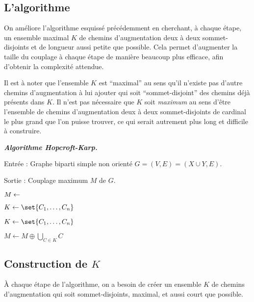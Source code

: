  \subsection{L'algorithme}
 
 On améliore l'algorithme esquissé précédemment en cherchant, à chaque étape, un ensemble maximal $K$ de chemins d'augmentation deux à deux sommet-disjoints et de longueur aussi petite que possible. Cela permet d'augmenter la taille du couplage à chaque étape de manière beaucoup plus efficace, afin d'obtenir la complexité attendue.
 
 Il est à noter que l'ensemble $K$ est ``maximal'' au sens qu'il n'existe pas d'autre chemins d'augmentation à lui ajouter qui soit ``sommet-disjoint'' des chemins déjà présents dans $K$. Il n'est pas nécessaire que $K$ soit \emph{maximum} au sens d'être l'ensemble de chemins d'augmentation deux à deux sommet-disjoints de cardinal le plus grand que l'on puisse trouver, ce qui serait autrement plus long et difficile à construire.
 
 \SEP \emph{\bfseries Algorithme Hopcroft-Karp.}
    
    Entrée : Graphe biparti simple non orienté $G = (V,E) = (X \cup Y, E)$.
    
    Sortie : Couplage maximum $M$ de $G$.
    \bigskip
    
    $M \leftarrow \empty$
    
    $K \leftarrow \set{C_1,\dots,C_n}$
    
    
    
    
    \hspace{2em} $K \leftarrow \set{C_1,\dots,C_n}$
    
    \hspace{2em} $ M \leftarrow M \oplus \bigcup_{C \in K} C$
    
    
 \SEP
 
 \subsection{Construction de $K$}
 
 À chaque étape de l'algorithme, on a besoin de créer un ensemble $K$ de chemins d'augmentation qui soit sommet-disjoints, maximal, et aussi court que possible.
 
